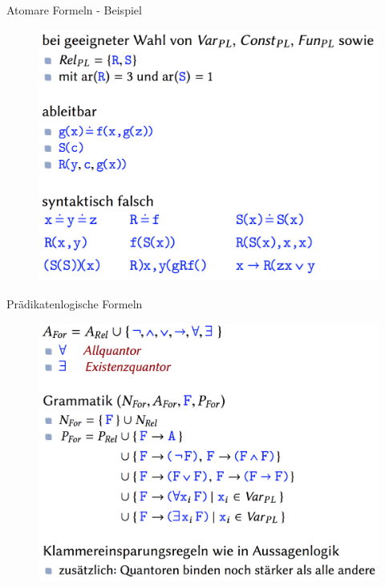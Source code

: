 \begin{frame}{Atomare Formeln - Beispiel}
\begin{figure}[h!]
	\centering
	\includegraphics[scale=0.2]{AFormelnBsp.png} \hspace{2em} 
\end{figure} 
\end{frame}

\begin{frame}{Prädikatenlogische Formeln}
\begin{figure}[h!]
	\centering
	\includegraphics[scale=0.2]{PFormeln.png} \hspace{2em} 
\end{figure} 
\end{frame}

